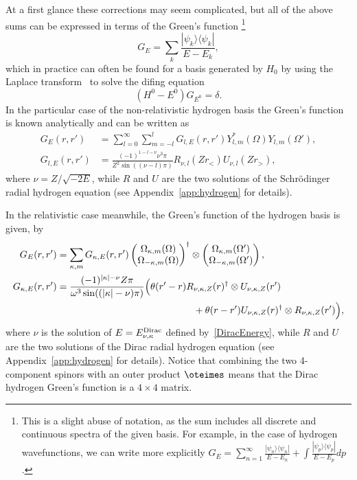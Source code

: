 At a first glance these corrections may seem complicated, but all of the above sums can be expressed in terms of the Green's function \footnote{This is a slight abuse of notation, as the sum includes all discrete and continuous spectra of the given basis. For example, in the case of hydrogen wavefunctions, we can write more explicitly $G_E = \sum_{n=1}^{\infty} \frac{|\psi_n \rangle\langle \psi_n|}{E-E_n} + \int \frac{|\psi_p \rangle\langle \psi_p|}{E-E_p} dp$.}
\begin{equation} \label{spectralG}
	G_E = \sum_{k} \frac{|\psi_k \rangle\langle \psi_k|}{E-E_k},
\end{equation}
which in practice can often be found for a basis generated by $H_0$ by using the Laplace transform~\cite{Swainson_1991} to solve the difing equation
\begin{equation}
	(H^0 - E^0)G_{E^0} = \delta.
\end{equation}
In the particular case of the non-relativistic hydrogen basis the Green's function is known analytically and can be written as~\cite{friedman1990principles}
\begin{align} \label{GreenESch}
G_E(r,r')
&=  \sum_{l=0}^\infty \sum_{m=-l}^{l} G_{l,E} (r,r')
Y_{l,m}^*(\Omega) Y_{l,m}(\Omega'), \nonumber
\\
G_{l,E} (r,r') &=\frac{(-1)^{1-l-\nu} \nu^3 \pi}{Z^2 \sin((\nu-l)\pi)}
R_{\nu,l}\left(Z r_{<}\right) U_{\nu,l}\left(Z r_{>}\right),
\end{align}
where $\nu = Z/\sqrt{-2E}$, while $R$ and $U$ are the two solutions of the Schr\"odinger radial hydrogen equation (see Appendix~\ref{app:hydrogen} for details).

In the relativistic case meanwhile, the Green's function of the hydrogen basis is given, by
\begin{align} \label{GreenEDirac}
G_E(r,r')
&=   \sum_{\kappa,m} G_{\kappa,E} (r,r') \left(\begin{matrix} \Omega_{\kappa,m}(\Omega) \\ \Omega_{-\kappa,m}(\Omega)\end{matrix}\right)^\dag \otimes \left(\begin{matrix} \Omega_{\kappa,m}(\Omega') \\ \Omega_{-\kappa,m}(\Omega')\end{matrix}\right),\nonumber
\\
G_{\kappa,E} (r,r') &=\frac{(-1)^{|\kappa|-\nu} Z \pi}{\omega^3 \sin((|\kappa|-\nu)\pi)}
\Big(\theta(r'-r)R_{\nu,\kappa,Z}(r)^\dag \otimes U_{\nu,\kappa,Z}(r') \nonumber
\\
&\hspace{50mm}+\theta(r-r')U_{\nu,\kappa,Z}(r)^\dag \otimes R_{\nu,\kappa,Z}(r')\Big),
\end{align}
where $\nu$ is the solution of $E=E^{\rm{Dirac}}_{\nu,\kappa}$ defined by~\eqref{DiracEnergy}, while $R$ and $U$ are the two solutions of the Dirac radial hydrogen equation (see Appendix~\ref{app:hydrogen} for details). Notice that combining the two 4-component spinors with an outer product $\oteimes$ means that the Dirac hydrogen Green's function is a $4\times4$ matrix.

